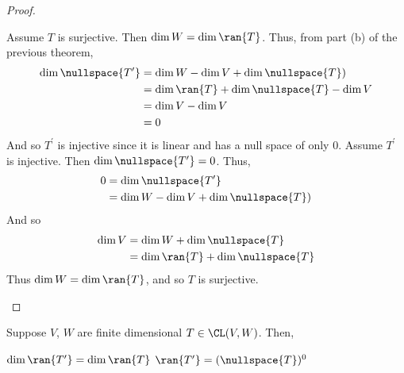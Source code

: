 \documentclass{article}
\begin{document}
  \begin{proof}
    \begin{enumerate}[label=\alph*)]
      \ii 
        Assume $T$ is surjective. Then $\dim W = \dim\ran{T}$. Thus, from part (b) of the previous theorem,
        \begin{align*}
          \dim\nullspace{T^{\prime}} & = \dim W - \dim V + \dim\nullspace{T}) \\
          & = \dim\ran{T} + \dim\nullspace{T} - \dim V\\
          & = \dim V - \dim V \\
          & = 0
        \end{align*}
        And so $T^{\prime}$ is injective since it is linear and has a null space of only $0$.
      \ii 
        Assume $T^{\prime}$ is injective. Then $\dim\nullspace{T^{\prime}} = 0$. Thus,
        \begin{align*}
          0 & = \dim\nullspace{T^{\prime}} \\
          & = \dim W - \dim V + \dim\nullspace{T}) \\
        \end{align*}
        And so 
        \begin{align*}
          \dim V & = \dim W + \dim\nullspace{T} \\
          & = \dim\ran{T} + \dim\nullspace{T}
        \end{align*}
        Thus $\dim W = \dim\ran{T}$, and so $T$ is surjective.
    \end{enumerate}
  \end{proof}
  \begin{prop}
    Suppose $V$, $W$ are finite dimensional $T \in \CL(V, W)$. Then,
    \begin{enumerate}[label=\alph*)]
        \ii 
          $\dim\ran{T^{\prime}} = \dim\ran{T}$
        \ii 
          $\ran{T^{\prime}} = (\nullspace{T})^0$
    \end{enumerate}
  \end{prop}
\end{document}
